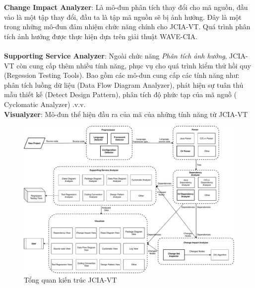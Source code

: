 \documentclass[12pt]{report}
\begin{document}
\noindent \textbf{Change Impact Analyzer}: Là mô-đun phân tích thay đổi cho mã nguồn, đầu vào là một tập thay đổi, đầu ta là tập mã nguồn sẽ bị ảnh hưởng. Đây là một trong những mô-đun đảm nhiệm chức năng chính cho JCIA-VT. Quá trình phân tích ảnh hưởng được thực hiện dựa trên giải thuật WAVE-CIA.\\\\
\noindent \textbf{Supporting Service Analyzer}: Ngoài chức năng \textit{Phân tích ảnh hưởng}, JCIA-VT còn cung cấp thêm nhiều tính năng, phục vụ cho quá trình kiểm thử hồi quy (Regession Testing Tools). Bao gồm các mô-đun cung cấp các tính năng như: phân tích luồng dữ liệu (Data Flow Diagram Analyzer), phát hiện sự tuân thủ mẫu thiết kế (Detect Design Pattern), phân tích độ phức tạp của mã nguồ ( Cyclomatic Analyzer) .v.v.\\
\textbf{Visualyzer}: Mô-đun thể hiện đầu ra của mã của những tính năng từ JCIA-VT 
\begin{figure}[h]
	\centering
	\includegraphics[scale=0.2]{images/architexture}
	\caption{Tổng quan kiến trúc JCIA-VT}
	\label{fig:architexture}
\end{figure}
\end{document}
